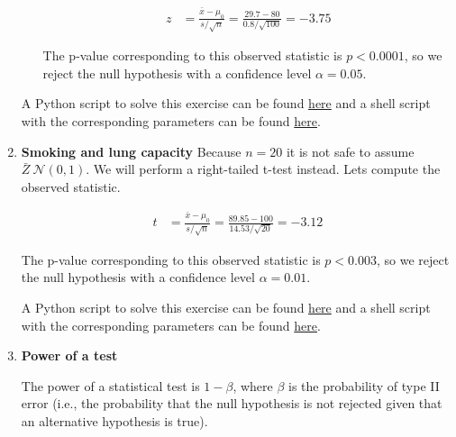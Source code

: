 \documentclass[12pt]{article}
\begin{document}
\begin{enumerate}
\begin{enumerate}[(a)]
                \begin{align*}
                    z &= \frac{\bar{x}-\mu_0}{s/\sqrt{n}}=\frac{29.7-80}{0.8/\sqrt{100}}=-3.75
                \end{align*}

                The p-value corresponding to this observed statistic is
                $p<0.0001$, so we reject the
                null hypothesis with a confidence level $\alpha=0.05$.

        \end{enumerate}

        A Python script to solve this exercise can be found
        \href{https://github.com/joacorapela/neuroinformatics24/blob/master/worksheets/01_tTestAndRandomizationTests/mySolution/code/doZTest.py}{here}
        and a shell script with the corresponding parameters can be found
        \href{https://github.com/joacorapela/neuroinformatics24/blob/master/worksheets/01_tTestAndRandomizationTests/mySolution/code/doEx3.csh}{here}.

    \item \textbf{Smoking and lung capacity}
        Because $n=20$ it is not safe to assume $\bar{Z}~\mathcal{N}(0,1)$. We
        will perform a right-tailed t-test instead. Lets compute the observed
        statistic.

        \begin{align*}
            t &= \frac{\bar{x}-\mu_0}{s/\sqrt{n}}=\frac{89.85-100}{14.53/\sqrt{20}}=-3.12
        \end{align*}

        The p-value corresponding to this observed statistic is
        $p<0.003$, so we reject the
        null hypothesis with a confidence level $\alpha=0.01$.

        A Python script to solve this exercise can be found
        \href{https://github.com/joacorapela/neuroinformatics24/blob/master/worksheets/01_tTestAndRandomizationTests/mySolution/code/doZTest.py}{here}
        and a shell script with the corresponding parameters can be found
        \href{https://github.com/joacorapela/neuroinformatics24/blob/master/worksheets/01_tTestAndRandomizationTests/mySolution/code/doEx4.csh}{here}.

    \item \textbf{Power of a test}

        The power of a statistical test is $1-\beta$, where $\beta$ is the
        probability of type II error (i.e., the probability that the null
        hypothesis is not rejected given that an alternative hypothesis is
        true).


\end{enumerate}
\end{document}
